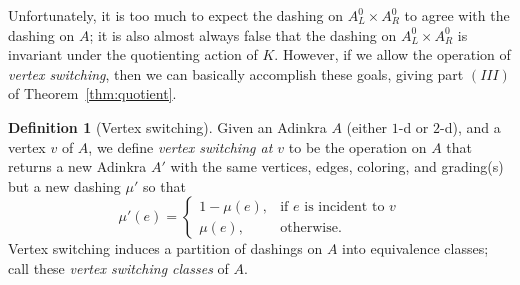 \documentclass[12pt,twoside,singlespace]{article}
\numberwithin{equation}{section}
\theoremstyle{definition}
\newtheorem{definition}[equation]{Definition}
\begin{document}
\begin{comment}




\begin{figure}[htb]
\begin{center}

\begin{tabular}{c|c}
\begin{tikzpicture}[scale=0.10]
\SetUpEdge[labelstyle={draw}]
\Vertex[x=0,y=0]{A}
\Vertex[x=10,y=0]{B}
\Vertex[x=20,y=0]{C}
\Vertex[x=30,y=0]{D}
\SetVertexNoLabel
\Vertex[x=0,y=20]{E}
\Vertex[x=10,y=20]{F}
\Vertex[x=20,y=20]{G}
\Vertex[x=30,y=20]{H}
\Edges(A, F, B, E, A)
\Edges(C, H, D, G, C)
\end{tikzpicture}
&
\begin{tikzpicture}[scale=0.10]
\SetUpEdge[labelstyle={draw}]
\Vertex[x=0,y=0]{A}
\Vertex[x=10,y=0]{C}
\Vertex[x=20,y=0]{B}
\Vertex[x=30,y=0]{D}
\SetVertexNoLabel
\Vertex[x=0,y=20]{E}
\Vertex[x=10,y=20]{G}
\Vertex[x=20,y=20]{F}
\Vertex[x=30,y=20]{H}
\Edges(A, G, C, E, A)
\Edges(B, H, D, F, B)
\end{tikzpicture}
\end{tabular}
\caption{Taking the product of the two adinkras here with the following identification gives a non-disconnected adinkra with 16 vertices. \label{fig:disconnected}}
\end{center}
\end{figure}

\end{comment}

Unfortunately, it is too much to expect the dashing on $A_L^0\times A_R^0$ to agree with the dashing on $A$; it is also almost always false that the dashing on $A_L^0\times A_R^0$ is invariant under the quotienting action of $K$. However, if we allow the operation of \emph{vertex switching}, then we can basically accomplish these goals, giving part $(III)$ of Theorem~\ref{thm:quotient}.

\begin{definition}[Vertex switching]
Given an Adinkra $A$ (either $1$-d or $2$-d), and a vertex $v$ of $A$, we define \emph{vertex switching at $v$} to be the operation on $A$ that returns a new Adinkra $A'$ with the same vertices, edges, coloring, and grading(s) but a new dashing $\mu'$ so that
\begin{equation}
\mu'(e)=\begin{cases}
1-\mu(e),&\mbox{if $e$ is incident to $v$}\\
\mu(e),&\mbox{otherwise.}
\end{cases}
\end{equation}
Vertex switching induces a partition of dashings on $A$ into equivalence classes; call these \emph{vertex switching classes} of $A$.
\end{definition}
\end{document}
